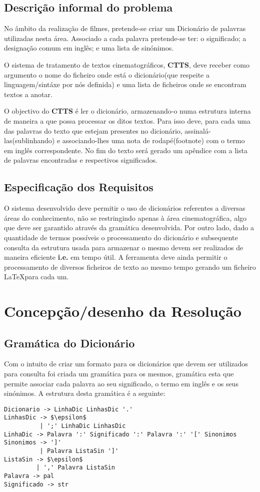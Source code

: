 \documentclass{llncs}
\begin{document}
\subsection{Descrição informal do problema}
No âmbito da realização de filmes, pretende-se criar um Dicionário de palavras utilizadas nesta área. Associado a cada palavra pretende-se ter: o significado; a designação comum em inglês; e uma lista de sinónimos.

O sistema de tratamento de textos cinematográficos, \textbf{CTTS}, deve receber como argumento o nome do ficheiro onde está o dicionário(que respeite a linguagem/sintáxe por nós definida) e uma lista de ficheiros onde se encontram textos a anotar.

O objectivo do \textbf{CTTS} é ler o dicionário, armazenando-o numa estrutura interna de maneira a que possa processar os ditos textos. Para isso deve, para cada uma das palavras do texto que estejam presentes no dicionário, assinalá-las(sublinhando) e associando-lhes uma nota de rodapé(footnote) com o termo em inglês correspondente. No fim do texto será gerado um apêndice com a lista de palavras encontradas e respectivos significados.

\subsection{Especificação dos Requisitos}
O sistema desenvolvido deve permitir o uso de dicionários referentes a diversas áreas do conhecimento, não se restringindo apenas à área cinematográfica, algo que deve ser garantido através da gramática desenvolvida. Por outro lado, dado a quantidade de termos possíveis o processamento do dicionário e subsequente consulta da estrutura usada para armazenar o mesmo devem ser realizados de maneira eficiente \textbf{i.e.} em tempo útil. A ferramenta deve ainda permitir o processamento de diversos ficheiros de texto ao mesmo tempo gerando um ficheiro \LaTeX para cada um.

\section{Concepção/desenho da Resolução}

\subsection{Gramática do Dicionário}
Com o intuito de criar um formato para os dicionários que devem ser utilizados para consulta foi criada um gramática para os mesmos, gramática esta que permite associar cada palavra ao seu significado, o termo em inglês e os seus sinónimos. 
A estrutura desta gramática é a seguinte:
\begin{lstlisting}[mathescape]
Dicionario -> LinhaDic LinhasDic '.' 
LinhasDic -> $\epsilon$ 
          | ';' LinhaDic LinhasDic 
LinhaDic -> Palavra ':' Significado ':' Palavra ':' '[' Sinonimos 
Sinonimos -> ']' 
          | Palavra ListaSin ']' 
ListaSin -> $\epsilon$ 
         | ',' Palavra ListaSin 
Palavra -> pal 
Significado -> str 
\end{lstlisting}
\end{document}
